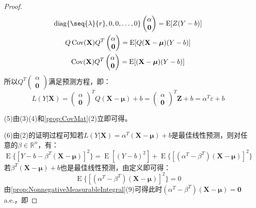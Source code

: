 \begin{proof}
\begin{gather*}
		\operatorname{diag}\{\seq{\lambda}{r},0,0,\dots,0\}
		\begin{pmatrix}
			\alpha \\
			\mathbf{0}	
		\end{pmatrix}=\operatorname{E}[Z(Y-b)] \\
		Q\operatorname{Cov}(\mathbf{X})Q^T
		\begin{pmatrix}
			\alpha \\
			\mathbf{0}	
		\end{pmatrix}=\operatorname{E}[Q(\mathbf{X}-\boldsymbol{\mu})(Y-b)] \\
		\operatorname{Cov}(\mathbf{X})Q^T
		\begin{pmatrix}
			\alpha \\
			\mathbf{0}	
		\end{pmatrix}=\operatorname{E}[(\mathbf{X}-\boldsymbol{\mu})(Y-b)] 
	\end{gather*}
	所以$Q^T
	\begin{pmatrix}
		\alpha \\
		\mathbf{0}
	\end{pmatrix}$满足预测方程，即：
	\begin{equation*}
		L(Y|\mathbf{X})=
		\begin{pmatrix}
			\alpha \\
			\mathbf{0}
		\end{pmatrix}^TQ(\mathbf{X}-\boldsymbol{\mu})+b=
		\begin{pmatrix}
		\alpha \\
		\mathbf{0}
		\end{pmatrix}^T\mathbf{Z}+b=\alpha^T\varepsilon+b
	\end{equation*}\par
	(5)由(3)(4)和\cref{prop:CovMat}(2)立即可得。\par
	(6)由(2)的证明过程可知若$L(Y|\mathbf{X})=\alpha^T(\mathbf{X}-\boldsymbol{\mu})+b$是最佳线性预测，则对任意的$\beta\in\mathbb{R}^{n}$，有：
	\begin{equation*}
		\operatorname{E}\{[Y-b-\beta^T(\mathbf{X}-\boldsymbol{\mu})]^2\}=\operatorname{E}[(Y-b)^2]+\operatorname{E}\{[(\alpha^T-\beta^T)(\mathbf{X}-\boldsymbol{\mu})]^2\}
	\end{equation*}
	若$\beta^T(\mathbf{X}-\boldsymbol{\mu})+b$也是最佳线性预测，由定义即可得：
	\begin{equation*}
		\operatorname{E}\{[(\alpha^T-\beta^T)(\mathbf{X}-\boldsymbol{\mu})]^2\}=0
	\end{equation*}
	由\cref{prop:NonnegativeMeasurableIntegral}(9)可得此时$(\alpha^T-\beta^T)(\mathbf{X}-\boldsymbol{\mu})=\mathbf{0}\;$a.e.，即

\end{proof}
